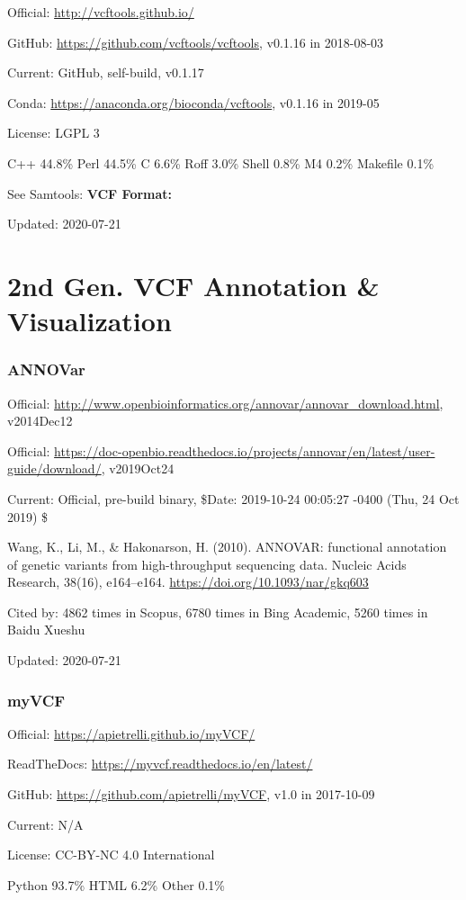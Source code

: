 \documentclass[]{article}
\newcommand{\cb}[3]{\par Cited by: {\color{blue}\Huge #1} times in Scopus, {\color{blue}\Huge #2} times in Bing Academic, {\color{blue}\Huge #3} times in Baidu Xueshu}
\begin{document}
Official: \url{http://vcftools.github.io/}

GitHub: \url{https://github.com/vcftools/vcftools}, v0.1.16 in 2018-08-03

Current: GitHub, self-build, v0.1.17

Conda: \url{https://anaconda.org/bioconda/vcftools}, v0.1.16 in 2019-05

License: LGPL 3

C++ 44.8\% Perl 44.5\% C 6.6\% Roff 3.0\% Shell 0.8\% M4 0.2\% Makefile 0.1\%

See Samtools: \textbf{VCF Format:}

Updated: 2020-07-21

\part{2nd Gen. VCF Annotation \& Visualization}
\section{ANNOVar}

Official: \url{http://www.openbioinformatics.org/annovar/annovar_download.html}, v2014Dec12

Official: \url{https://doc-openbio.readthedocs.io/projects/annovar/en/latest/user-guide/download/}, v2019Oct24

Current: Official, pre-build binary, \$Date: 2019-10-24 00:05:27 -0400 (Thu, 24 Oct 2019) \$

Wang, K., Li, M., \& Hakonarson, H. (2010). ANNOVAR: functional annotation of genetic variants from high-throughput sequencing data. Nucleic Acids Research, 38(16), e164–e164. \url{https://doi.org/10.1093/nar/gkq603}\cb{4862}{6780}{5260}

Updated: 2020-07-21

\section{myVCF}

Official: \url{https://apietrelli.github.io/myVCF/}

ReadTheDocs: \url{https://myvcf.readthedocs.io/en/latest/}

GitHub: \url{https://github.com/apietrelli/myVCF}, v1.0 in 2017-10-09

Current: N/A

License: CC-BY-NC 4.0 International

Python 93.7\% HTML 6.2\% Other 0.1\%
\end{document}
